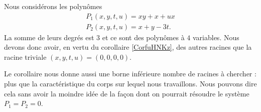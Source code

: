 \begin{example}
    Nous considérons les polynômes
    \begin{subequations}
        \begin{align}
            P_1(x,y,t,u)=xy+x+ux\\
            P_2(x,y,t,u)=x+y-3t.
        \end{align}
    \end{subequations}
    La somme de leurs degrés est \( 3\) et ce sont des polynômes à \( 4\) variables. Nous devons donc avoir, en vertu du corollaire \ref{CorfuHNKz}, des autres racines que la racine triviale \( (x,y,t,u)=(0,0,0,0)\).

    Le corollaire nous donne aussi une borne inférieure nombre de racines à chercher : plus que la caractéristique du corps sur lequel nous travaillons. Nous pouvons dire cela sans avoir la moindre idée de la façon dont on pourrait résoudre le système \( P_1=P_2=0\).
\end{example}
